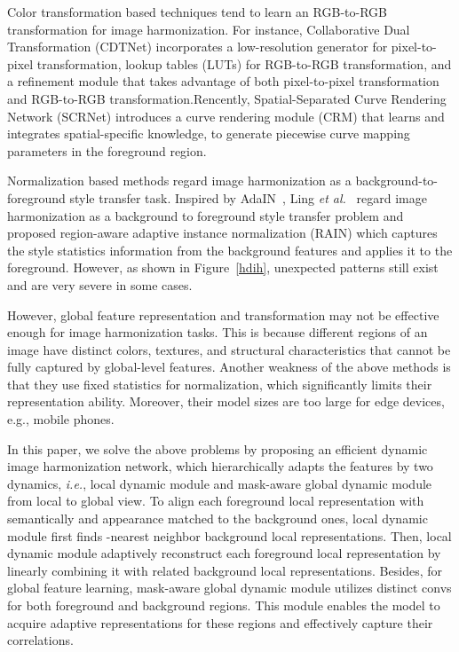 \documentclass[sigconf]{acmart}
\begin{document}
Color transformation based techniques tend to learn an RGB-to-RGB transformation for image harmonization. For instance, Collaborative Dual Transformation (CDTNet)\cite{CDTNet} incorporates a low-resolution generator for pixel-to-pixel transformation, lookup tables (LUTs) for RGB-to-RGB transformation, and a refinement module that takes advantage of both pixel-to-pixel transformation and RGB-to-RGB transformation.Rencently, Spatial-Separated Curve Rendering Network (SCRNet)\cite{liang2021spatial} introduces a curve rendering module (CRM) that learns and integrates spatial-specific knowledge, to generate piecewise curve mapping parameters in the foreground region. 

Normalization based methods regard image harmonization as a background-to-foreground style transfer task. Inspired by AdaIN~\cite{AdaIN}, Ling \textit{et al.}~\cite{RAIN} regard image harmonization as a background to foreground style transfer problem and proposed region-aware adaptive instance normalization (RAIN) which captures the style statistics information from the background features and applies it to the foreground. However, as shown in Figure~\ref{hdih}, unexpected patterns still exist and are very severe in some cases. 


However, global feature representation and transformation may not be effective enough for image harmonization tasks. This is because different regions of an image have distinct colors, textures, and structural characteristics that cannot be fully captured by global-level features. Another weakness of the above methods is that they use fixed statistics for normalization, which significantly limits their representation ability. Moreover, their model sizes are too large for edge devices, e.g., mobile phones. 

In this paper, we solve the above problems by proposing an efficient dynamic image harmonization network, which hierarchically adapts the features by two dynamics, \emph{i.e.}, local dynamic module and mask-aware global dynamic module from local to global view. To align each foreground local representation with semantically and appearance matched to the background ones, local dynamic module first finds -nearest neighbor background local representations. Then, local dynamic module adaptively reconstruct each foreground local representation by linearly combining it with related background local representations. Besides, for global feature learning, mask-aware global dynamic module utilizes distinct convs for both foreground and background regions. This module enables the model to acquire adaptive representations for these regions and effectively capture their correlations.
\end{document}
